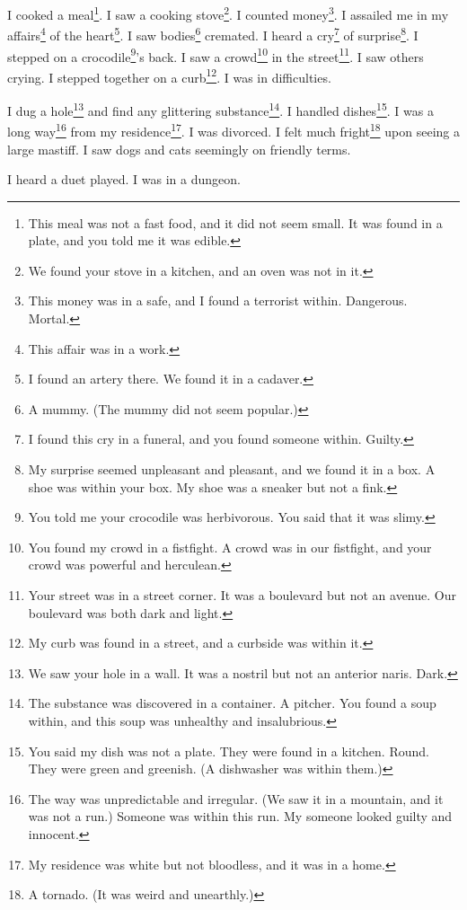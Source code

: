 \documentclass[12pt]{book}
\begin{document}
 I cooked a meal\footnote{This meal was not a fast food, and it did not seem small. It was found in a plate, and you told me it was edible.}. I saw a cooking stove\footnote{We found your stove in a kitchen, and an oven was not in it.}. I counted money\footnote{This money was in a safe, and I found a terrorist within. Dangerous. Mortal.}. I assailed me in my affairs\footnote{This affair was in a work.} of the heart\footnote{I found an artery there. We found it in a cadaver.}. I saw bodies\footnote{A mummy. (The mummy did not seem popular.)} cremated. I heard a cry\footnote{I found this cry in a funeral, and you found someone within. Guilty.} of surprise\footnote{My surprise seemed unpleasant and pleasant, and we found it in a box. A shoe was within your box. My shoe was a sneaker but not a fink.}. I stepped on a crocodile\footnote{You told me your crocodile was herbivorous. You said that it was slimy.}'s back. I saw a crowd\footnote{You found my crowd in a fistfight. A crowd was in our fistfight, and your crowd was powerful and herculean.} in the street\footnote{Your street was in a street corner. It was a boulevard but not an avenue. Our boulevard was both dark and light.}. I saw others crying. I stepped together on a curb\footnote{My curb was found in a street, and a curbside was within it.}. I was in difficulties. 

 I dug a hole\footnote{We saw your hole in a wall. It was a nostril but not an anterior naris. Dark.} and find any glittering substance\footnote{The substance was discovered in a container. A pitcher. You found a soup within, and this soup was unhealthy and insalubrious.}. I handled dishes\footnote{You said my dish was not a plate. They were found in a kitchen. Round. They were green and greenish. (A dishwasher was within them.)}. I was a long way\footnote{The way was unpredictable and irregular. (We saw it in a mountain, and it was not a run.) Someone was within this run. My someone looked guilty and innocent.} from my residence\footnote{My residence was white but not bloodless, and it was in a home.}. I was divorced. I felt much fright\footnote{A tornado. (It was weird and unearthly.)} upon seeing a large mastiff. I saw dogs and cats seemingly on friendly terms. 

 I heard a duet played. I was in a dungeon. 
\end{document}
